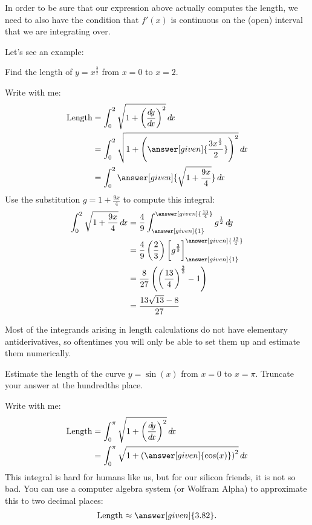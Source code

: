\documentclass{ximera}
\begin{document}
\begin{warning}
  In order to be sure that our expression above actually computes the
  length, we need to also have the condition that $f'(x)$ is
  continuous on the (open) interval that we are integrating over.
\end{warning}

Let's see an example:
\begin{example}%
  Find the length of $y = x^{\frac{3}{2}}$ from $x=0$ to $x=2$.
  \begin{explanation}
    Write with me:
    \begin{align*}
      \text{Length} &= \int_0^2 \sqrt{1+\left( \frac{\d y}{ \d x}\right)^2} \d x\\
      &= \int_0^2 \sqrt{1+\left(
        \answer[given]{\frac{3 x^{\frac{1}{2}}}{2}}\right)^2} \d x\\
      &= \int_0^2 \answer[given]{\sqrt{1+\frac{9x}{4}}} \d x
    \end{align*}
      Use the substitution $g = 1+\frac{9x}{4}$ to compute this integral:
      \begin{align*}
	\int_0^2 \sqrt{1+\frac{9x}{4}} \d x &= \frac{4}{9} \int_{\answer[given]{1}}^{\answer[given]{\frac{13}{4}}} g^\frac{1}{2} \d g\\
	&= \frac{4}{9} \left(\frac{2}{3}\right) \eval{g^{\frac{3}{2}}}_{\answer[given]{1}}^{\answer[given]{\frac{13}{4}}}\\
	&=\frac{8}{27} \left(\left(\frac{13}{4}\right)^\frac{3}{2} - 1\right)\\
	&=\frac{13\sqrt{13} - 8}{27}
      \end{align*}
  \end{explanation}
\end{example}

Most of the integrands arising in length calculations do not have
elementary antiderivatives, so oftentimes you will only be able to set
them up and estimate them numerically.

\begin{example}
  Estimate the length of the curve $y = \sin(x)$ from $x=0$ to $x =
  \pi$.  Truncate your answer at the hundredths place.
  \begin{explanation}
    Write with me:
    \begin{align*}
      \text{Length} &= \int_0^\pi \sqrt{1+\left( \frac{\d y}{ \d x}\right)^2} \d x\\
      &= \int_0^\pi \sqrt{1+\left(
        \answer[given]{\cos(x)}\right)^2} \d x
    \end{align*}
    This integral is hard for humans like us, but for our silicon
    friends, it is not so bad.  You can use a computer algebra system
    (or Wolfram Alpha) to approximate this to two decimal places:
    \[
    \text{Length} \approx \answer[given]{3.82}.
    \]
  \end{explanation}
\end{example}
\end{document}
